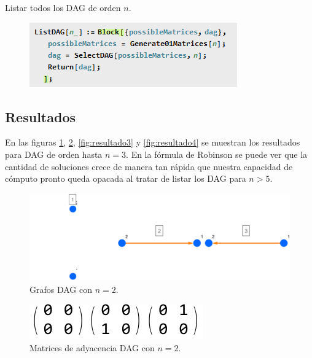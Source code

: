 \documentclass[10pt,a4paper]{article}
\begin{document}
Listar todos los DAG de orden $n$.

\begin{figure}[H]
\centering
\includegraphics[scale=0.6]{img/codigo4}
\end{figure}


\subsection{Resultados}
En las figuras \ref{fig:resultado1}, \ref{fig:resultado2}, \ref{fig:resultado3} y \ref{fig:resultado4} se muestran los resultados para DAG de orden hasta $n=3$. En la fórmula de Robinson se puede ver que la cantidad de soluciones crece de manera tan rápida que nuestra capacidad de cómputo pronto queda opacada al tratar de listar los DAG para $n>5$.

\begin{figure}[h!]
\centering
\includegraphics[scale=0.6]{img/grafosDAG2}
\caption{Grafos DAG con $n=2$.}
\label{fig:resultado1}
\end{figure}

\begin{figure}[h!]
\centering
\includegraphics[scale=0.8]{img/matrixDAG2}
\caption{Matrices de adyacencia DAG con $n=2$.}
\label{fig:resultado2}
\end{figure}
\end{document}
